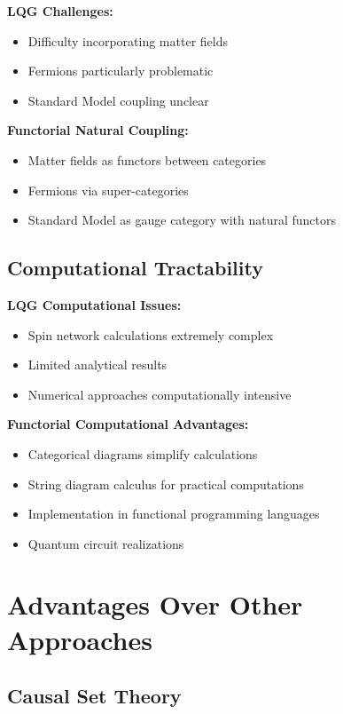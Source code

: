 \documentclass[11pt,a4paper]{article}
\begin{document}
\textbf{LQG Challenges:}
\begin{itemize}
    \item Difficulty incorporating matter fields
    \item Fermions particularly problematic
    \item Standard Model coupling unclear
\end{itemize}

\textbf{Functorial Natural Coupling:}
\begin{itemize}
    \item Matter fields as functors between categories
    \item Fermions via super-categories
    \item Standard Model as gauge category with natural functors
\end{itemize}

\subsection{Computational Tractability}

\textbf{LQG Computational Issues:}
\begin{itemize}
    \item Spin network calculations extremely complex
    \item Limited analytical results
    \item Numerical approaches computationally intensive
\end{itemize}

\textbf{Functorial Computational Advantages:}
\begin{itemize}
    \item Categorical diagrams simplify calculations
    \item String diagram calculus for practical computations
    \item Implementation in functional programming languages
    \item Quantum circuit realizations
\end{itemize}

\section{Advantages Over Other Approaches}

\subsection{Causal Set Theory}
\end{document}
